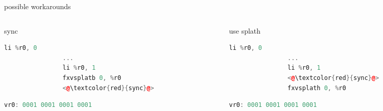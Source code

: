 \documentclass[10pt]{beamer}
\begin{document}
\begin{frame}[fragile]{possible workarounds}{}
	\begin{columns}[t]
		\begin{column}{0.4\textwidth}
			\begin{block}{sync}
			\begin{lstlisting}[language=C++,basicstyle=\ttfamily\scriptsize,keywordstyle=\color{red}]
				li %r0, 0
				...
				li %r0, 1
				fxvsplatb 0, %r0
				<@\textcolor{red}{sync}@>
			\end{lstlisting}
      		\begin{lstlisting}[language=C++,basicstyle=\fontsize{5}{7}\selectfont\ttfamily,keywordstyle=\color{red}]
				vr0: 0001 0001 0001 0001
			\end{lstlisting}
			\end{block}
    	\end{column}
    	\begin{column}{0.4\textwidth}
    		\begin{block}{use splath}
    		\begin{lstlisting}[language=C++,basicstyle=\ttfamily\scriptsize,keywordstyle=\color{red}]
				li %r0, 0
				...
				li %r0, 1
				<@\textcolor{red}{sync}@>
				fxvsplath 0, %r0
			\end{lstlisting}
      		\begin{lstlisting}[language=C++,basicstyle=\fontsize{5}{7}\selectfont\ttfamily,keywordstyle=\color{red}]
				vr0: 0001 0001 0001 0001
			\end{lstlisting}
			\end{block}
    	\end{column}
	\end{columns}
\end{frame}
\end{document}
